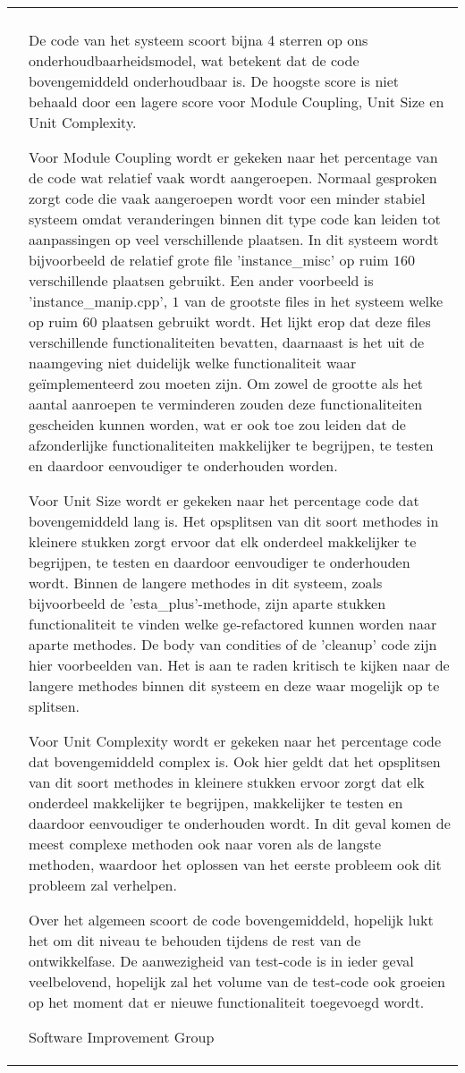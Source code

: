 \begin{tabular}{p{0.5cm} | p{\textwidth - 2cm} |}
\cline{2-2}
 & \\ & \setlength{\parskip}{5pt}
De code van het systeem scoort bijna 4 sterren op ons onderhoudbaarheidsmodel, wat betekent dat de code bovengemiddeld onderhoudbaar is. De hoogste score is niet behaald door een lagere score voor Module Coupling, Unit Size en Unit Complexity.

Voor Module Coupling wordt er gekeken naar het percentage van de code wat relatief vaak wordt aangeroepen. Normaal gesproken zorgt code die vaak aangeroepen wordt voor een minder stabiel systeem omdat veranderingen binnen dit type code kan leiden tot aanpassingen op veel verschillende plaatsen. In dit systeem wordt bijvoorbeeld de relatief grote file 'instance\_misc' op ruim $160$ verschillende plaatsen gebruikt. Een ander voorbeeld is 'instance\_manip.cpp', $1$ van de grootste files in het systeem welke op ruim $60$ plaatsen gebruikt wordt. Het lijkt erop dat deze files verschillende functionaliteiten bevatten, daarnaast is het uit de naamgeving niet duidelijk welke functionaliteit waar geïmplementeerd zou moeten zijn. Om zowel de grootte als het aantal aanroepen te verminderen zouden deze functionaliteiten gescheiden kunnen worden, wat er ook toe zou leiden dat de afzonderlijke functionaliteiten makkelijker te begrijpen, te testen en daardoor eenvoudiger te onderhouden worden.

Voor Unit Size wordt er gekeken naar het percentage code dat bovengemiddeld lang is. Het opsplitsen van dit soort methodes in kleinere stukken zorgt ervoor dat elk onderdeel makkelijker te begrijpen, te testen en daardoor eenvoudiger te onderhouden wordt. Binnen de langere methodes in dit systeem, zoals bijvoorbeeld de 'esta\_plus'-methode, zijn aparte stukken functionaliteit te vinden welke ge-refactored kunnen worden naar aparte methodes. De body van condities of de 'cleanup' code zijn hier voorbeelden van. Het is aan te raden kritisch te kijken naar de langere methodes binnen dit systeem en deze waar mogelijk op te splitsen.

Voor Unit Complexity wordt er gekeken naar het percentage code dat bovengemiddeld complex is. Ook hier geldt dat het opsplitsen van dit soort methodes in kleinere stukken ervoor zorgt dat elk onderdeel makkelijker te begrijpen, makkelijker te testen en daardoor eenvoudiger te onderhouden wordt. In dit geval komen de meest complexe methoden ook naar voren als de langste methoden, waardoor het oplossen van het eerste probleem ook dit probleem zal verhelpen.

Over het algemeen scoort de code bovengemiddeld, hopelijk lukt het om dit niveau te behouden tijdens de rest van de ontwikkelfase. De aanwezigheid van test-code is in ieder geval veelbelovend, hopelijk zal het volume van de test-code ook groeien op het moment dat er nieuwe functionaliteit toegevoegd wordt. 

\hfill Software Improvement Group \\
\cline{2-2}
\end{tabular}
